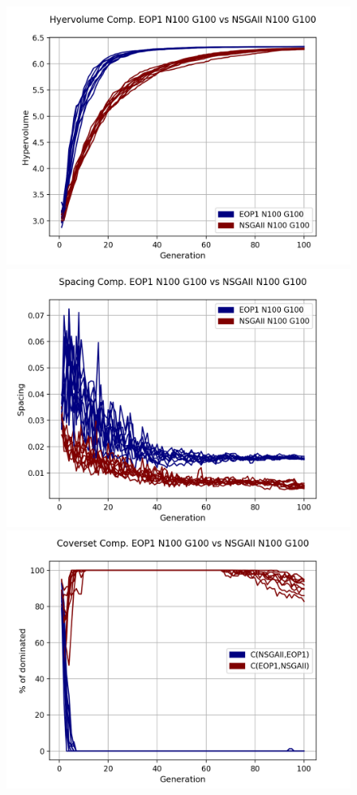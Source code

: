 \begin{figure}[H]
\includegraphics[scale=0.35]{../METRICS_PLOTS/Hypervol_COMP_EOP1N100G100_NSGAIIN100G100.png}
\includegraphics[scale=0.35]{../METRICS_PLOTS/Spacing_COMP_EOP1N100G100_NSGAIIN100G100.png}
\includegraphics[scale=0.35]{../METRICS_PLOTS/CoverSet_COMP_EOP1N100G100_NSGAIIN100G100.png}\\

\end{figure}
